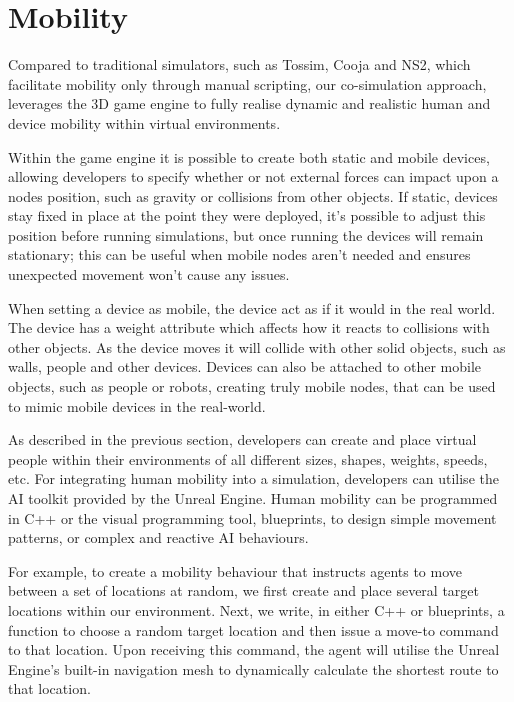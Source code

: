 \section{Mobility} %
\label{sec:mobility}
Compared to traditional simulators, such as Tossim\cite{tossim}, Cooja\cite{cooja} and NS2\cite{NS2}, which facilitate mobility only through manual scripting, our co-simulation approach, leverages the 3D game engine to fully realise dynamic and realistic human and device mobility within virtual environments.

Within the game engine it is possible to create both static and mobile devices, allowing developers to specify whether or not external forces can impact upon a nodes position, such as gravity or collisions from other objects. If static, devices stay fixed in place at the point they were deployed, it's possible to adjust this position before running simulations, but once running the devices will remain stationary; this can be useful when mobile nodes aren't needed and ensures unexpected movement won't cause any issues.

When setting a device as mobile, the device act as if it would in the real world. The device has a weight attribute which affects how it reacts to collisions with other objects. As the device moves it will collide with other solid objects, such as walls, people and other devices. Devices can also be attached to other mobile objects, such as people or robots, creating truly mobile nodes, that can be used to mimic mobile devices in the real-world.

As described in the previous section, developers can create and place virtual people within their environments of all different sizes, shapes, weights, speeds, etc. For integrating human mobility into a simulation, developers can utilise the AI toolkit provided by the Unreal Engine. Human mobility can be programmed in C++ or the visual programming tool, blueprints, to design simple movement patterns, or complex and reactive AI behaviours. 

For example, to create a mobility behaviour that instructs agents to move between a set of locations at random, we first create and place several target locations within our environment. Next, we write, in either C++ or blueprints, a function to choose a random target location and then issue a move-to command to that location. Upon receiving this command, the agent will utilise the Unreal Engine's built-in navigation mesh to dynamically calculate the shortest route to that location.

